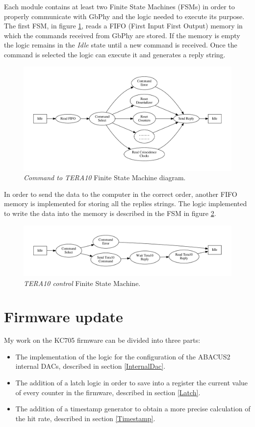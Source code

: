 \noindent Each module contains at least two Finite State Machines (FSMs) in order to properly communicate with GbPhy and the logic needed to execute its purpose. The first FSM, in figure \ref{fig:fsmFIFO1}, reads a FIFO (First Input First Output) memory in which the commands received from GbPhy are stored. If the memory is empty the logic remains in the \textit{Idle} state until a new command is received. Once the command is selected the logic can execute it and generates a reply string.
\begin{figure}[H]
	\centering
	\includegraphics[width=1.0\linewidth]{FSMdiagrams/CMDtoTERA10.pdf}
	\caption{\textit{Command to TERA10} Finite State Machine diagram.}
	\label{fig:fsmFIFO1}
\end{figure}
\noindent In order to send the data to the computer in the correct order, another FIFO memory is implemented for storing all the replies strings.
The logic implemented to write the data into the memory is described in the FSM in figure \ref{fig:fsmFIFO2}.
\begin{figure}[H]
	\centering
	\includegraphics[width=1.0\linewidth]{FSMdiagrams/TERA10controll.pdf}
	\caption{\textit{TERA10 control} Finite State Machine.}
	\label{fig:fsmFIFO2}
\end{figure}  

\section{Firmware update}
My work on the KC705 firmware can be divided into three parts:
\begin{itemize}
	\item The implementation of the logic for the configuration of the ABACUS2 internal DACs, described in section \ref{InternalDac}. 
	\item The addition of a latch logic in order to save into a register the current value of every counter in the firmware, described in section \ref{Latch}.
	\item The addition of a timestamp generator to obtain a more precise calculation of the hit rate, described in section \ref{Timestamp}. 
\end{itemize}

